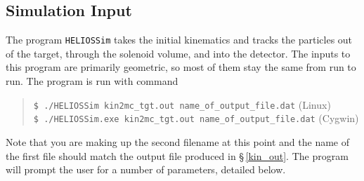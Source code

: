 \subsection{Simulation Input}
The program \texttt{HELIOSSim} takes the initial kinematics and tracks the particles out of the target, through the solenoid volume, and into the detector.  The inputs to this program are primarily geometric, so most of them stay the same from run to run.  The program is run with command
\begin{quote}
\texttt{{\color{green}\$} ./HELIOSSim kin2mc\_tgt.out name\_of\_output\_file.dat} (Linux) \\
\texttt{{\color{green}\$} ./HELIOSSim.exe kin2mc\_tgt.out name\_of\_output\_file.dat} (Cygwin)
\end{quote} Note that you are making up the second filename at this point and the name of the first file should match the output file produced in \S\,\ref{kin_out}.  The program will prompt the user for a number of parameters, detailed below.
\vspace{-1.0\baselineskip}
